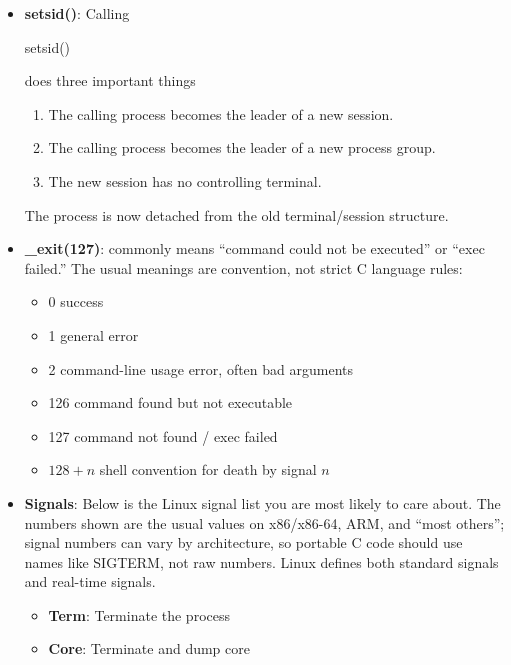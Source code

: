 \documentclass{report}
\begin{document}
\begin{itemize}
            \item \textbf{setsid()}: Calling 
                \bigbreak \noindent 
                \begin{bashcode}
                setsid()
                \end{bashcode}
                \bigbreak \noindent 
                does three important things
                \begin{enumerate}
                    \item The calling process becomes the leader of a new session.
                    \item The calling process becomes the leader of a new process group.
                    \item The new session has no controlling terminal.
                \end{enumerate}
                The process is now detached from the old terminal/session structure.
            \item \textbf{\_exit(127)}: commonly means “command could not be executed” or “exec failed.”
                \bigbreak \noindent 
                The usual meanings are convention, not strict C language rules:
                \begin{itemize}
                    \item 0      success
                    \item 1      general error
                    \item 2      command-line usage error, often bad arguments
                    \item 126    command found but not executable
                    \item 127    command not found / exec failed
                    \item $128+n$  shell convention for death by signal $n$
                \end{itemize}
            \item \textbf{Signals}: Below is the Linux signal list you are most likely to care about. The numbers shown are the usual values on x86/x86-64, ARM, and “most others”; signal numbers can vary by architecture, so portable C code should use names like SIGTERM, not raw numbers. Linux defines both standard signals and real-time signals. 
                \begin{itemize}
                    \item \textbf{Term}:	Terminate the process
                    \item \textbf{Core}:	Terminate and dump core

\end{itemize}
\end{itemize}
\end{document}
